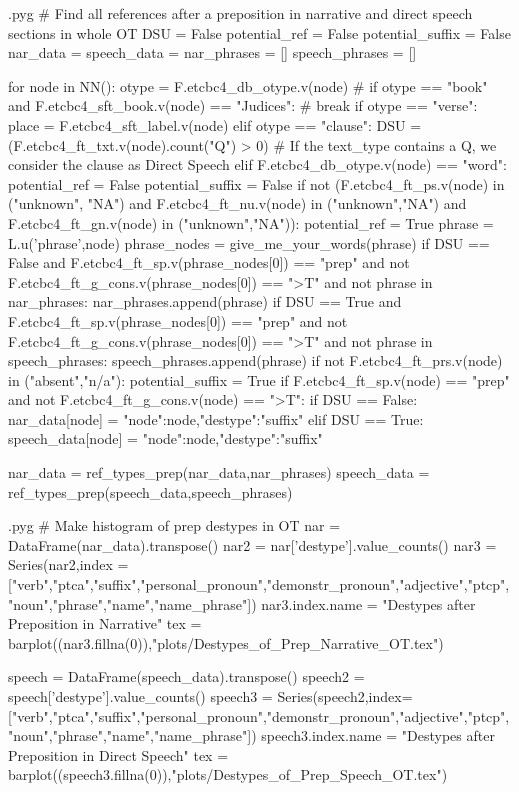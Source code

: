 \documentclass{report}
\makeatletter
\newenvironment{python}{%
  \VerbatimEnvironment
  \minted@resetoptions
  \setkeys{minted@opt}{}
      \begin{VerbatimOut}{\jobname.pyg}}
{%
      \end{VerbatimOut}
      \minted@pygmentize{python}
      \DeleteFile{\jobname.pyg}}
\makeatother
\begin{document}
\begin{python}
# Find all references after a preposition in narrative and direct speech sections in whole OT 
DSU = False
potential_ref = False
potential_suffix = False
nar_data = {}
speech_data = {}
nar_phrases = []
speech_phrases = []

for node in NN():
    otype = F.etcbc4_db_otype.v(node)
#    if otype == "book" and F.etcbc4_sft_book.v(node) == "Judices":
#        break
    if otype == "verse":
        place = F.etcbc4_sft_label.v(node)
    elif otype == "clause":
        DSU = (F.etcbc4_ft_txt.v(node).count("Q") > 0)    # If the text_type contains a Q, we consider the clause as Direct Speech
    elif F.etcbc4_db_otype.v(node) == "word":
        potential_ref = False
        potential_suffix = False
        if not (F.etcbc4_ft_ps.v(node) in ("unknown", "NA") and F.etcbc4_ft_nu.v(node) in ("unknown","NA") and F.etcbc4_ft_gn.v(node) in ("unknown","NA")):
            potential_ref = True
            phrase = L.u('phrase',node)
            phrase_nodes = give_me_your_words(phrase)
            if DSU == False and F.etcbc4_ft_sp.v(phrase_nodes[0]) == "prep" and not F.etcbc4_ft_g_cons.v(phrase_nodes[0]) == ">T" and not phrase in nar_phrases:
                nar_phrases.append(phrase)
            if DSU == True and F.etcbc4_ft_sp.v(phrase_nodes[0]) == "prep" and not F.etcbc4_ft_g_cons.v(phrase_nodes[0]) == ">T" and not phrase in speech_phrases:
                speech_phrases.append(phrase) 
        if not F.etcbc4_ft_prs.v(node) in ("absent","n/a"):
            potential_suffix = True
            if F.etcbc4_ft_sp.v(node) == "prep" and not F.etcbc4_ft_g_cons.v(node) == ">T":
                if DSU == False:
                    nar_data[node] = {"node":node,"destype":"suffix"}
                elif DSU == True:
                    speech_data[node] = {"node":node,"destype":"suffix"}

nar_data = ref_types_prep(nar_data,nar_phrases)
speech_data = ref_types_prep(speech_data,speech_phrases)

\end{python}

\begin{python}
# Make histogram of prep destypes in OT
nar = DataFrame(nar_data).transpose()
nar2 = nar['destype'].value_counts()
nar3 = Series(nar2,index = ["verb","ptca","suffix","personal_pronoun","demonstr_pronoun","adjective","ptcp","noun","phrase","name","name_phrase"])
nar3.index.name = "Destypes after Preposition in Narrative"
tex = barplot((nar3.fillna(0)),"plots/Destypes_of_Prep_Narrative_OT.tex")

speech = DataFrame(speech_data).transpose()
speech2 = speech['destype'].value_counts()
speech3 = Series(speech2,index=["verb","ptca","suffix","personal_pronoun","demonstr_pronoun","adjective","ptcp","noun","phrase","name","name_phrase"])
speech3.index.name = "Destypes after Preposition in Direct Speech"
tex = barplot((speech3.fillna(0)),"plots/Destypes_of_Prep_Speech_OT.tex")

\end{python}
\end{document}
